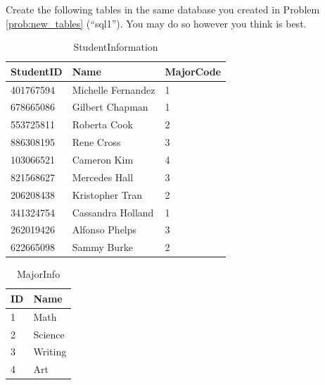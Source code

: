 \begin{problem}
Create the following tables in the same database you created in Problem \ref{prob:new_tables} (``sql1'').  You may do so however you think is best.

\begin{table}[H]
\begin{tabular}{|l|l|l|}
\hline
StudentID & Name & MajorCode \\
\hline
401767594 & Michelle Fernandez & 1 \\
678665086 & Gilbert Chapman & 1 \\
553725811 & Roberta Cook & 2 \\
886308195 & Rene Cross & 3 \\
103066521 & Cameron Kim & 4 \\
821568627 & Mercedes Hall & 3 \\
206208438 & Kristopher Tran & 2 \\
341324754 & Cassandra Holland & 1 \\
262019426 & Alfonso Phelps & 3 \\
622665098 & Sammy Burke &2 \\
\hline
\end{tabular}
\caption{StudentInformation}
\end{table}

\begin{table}[H]
\begin{tabular}{|l|l|}
\hline
ID & Name \\
\hline
1 & Math \\
2 & Science \\
3 & Writing \\
4 & Art \\
\hline
\end{tabular}
\caption{MajorInfo}
\end{table}


\end{problem}
